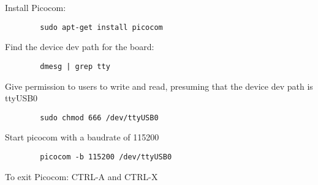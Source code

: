 \begin{myitemize}
    \item Install Picocom:

    \begin{tcolorbox}
        \begin{verbatim}
        sudo apt-get install picocom
        \end{verbatim}
    \end{tcolorbox}

    \item Find the device dev path for the board:

    \begin{tcolorbox}
        \begin{verbatim}
        dmesg | grep tty
        \end{verbatim}
    \end{tcolorbox}

    \item Give permission to users to write and read, presuming that the device dev path is ttyUSB0

    \begin{tcolorbox}
        \begin{verbatim}
        sudo chmod 666 /dev/ttyUSB0
        \end{verbatim}
    \end{tcolorbox}

    \item Start picocom with a baudrate of 115200 

    \begin{tcolorbox}
        \begin{verbatim}
        picocom -b 115200 /dev/ttyUSB0
        \end{verbatim}
    \end{tcolorbox}

    \item To exit Picocom: CTRL-A and CTRL-X


\end{myitemize}
